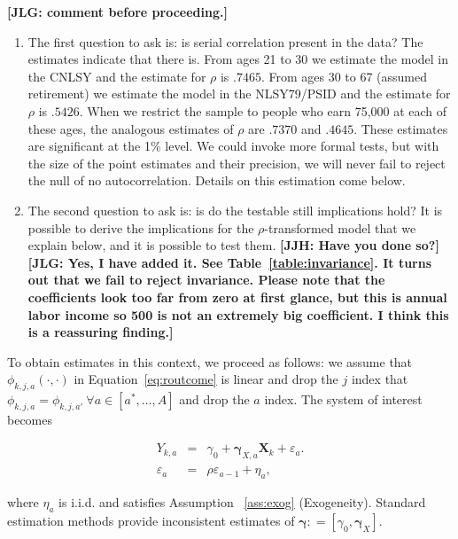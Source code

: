 \noindent \textbf{[JLG: comment before proceeding.]}\\

\begin{enumerate}

\item The first question to ask is: is serial correlation present in the data? The estimates indicate that there is. From ages 21 to 30 we estimate the model in the CNLSY and the estimate for $\rho$ is $.7465$. From ages 30 to 67 (assumed retirement) we estimate the model in the NLSY79/PSID and the estimate for $\rho$ is $.5426$. When we restrict the sample to people who earn 75,000 at each of these ages, the analogous estimates of $\rho$ are $.7370$ and $.4645$. These estimates are significant at the 1\% level. We could invoke more formal tests, but with the size of the point estimates and their precision, we will never fail to reject the null of no autocorrelation. Details on this estimation come below.\\

\item The second question to ask is: is do the testable still implications hold?  It is possible to derive the implications for the $\rho$-transformed model that we explain below, and it is possible to test them. \textbf{[JJH: Have you done so?] [JLG: Yes, I have added it. See Table~\ref{table:invariance}. It turns out that we fail to reject invariance. Please note that the coefficients look too far from zero at first glance, but this is annual labor income so 500 is not an extremely big coefficient. I think this is a reassuring finding.]}\\

\end{enumerate}

\noindent To obtain estimates in this context, we proceed as follows: we assume that $\phi_{k,j,a} \left( \cdot, \cdot \right)$ in Equation~\eqref{eq:routcome} is linear and drop the $j$ index that $\phi_{k,j,a} = \phi_{k,j,a'} \ \forall a \in [a^*, \ldots, A]$ and drop the $a$ index. The system of interest becomes

\begin{eqnarray}
Y_{k,a} &=&\gamma_{0} + \bm{\gamma}_{X,a} \bm{X}_{k} + \varepsilon_{a}. \label{eq:linear1} \\
\varepsilon_{a} &=& \rho \varepsilon_{a-1} + \eta_{a}, \label{eq:linear2}
\end{eqnarray}

\noindent where $\eta_{a}$ is i.i.d. and satisfies Assumption ~\ref{ass:exog} (Exogeneity). Standard estimation methods provide inconsistent estimates of $\bm{\gamma} : = [\gamma_{0}, \bm{\gamma}_{X}]$.\\

